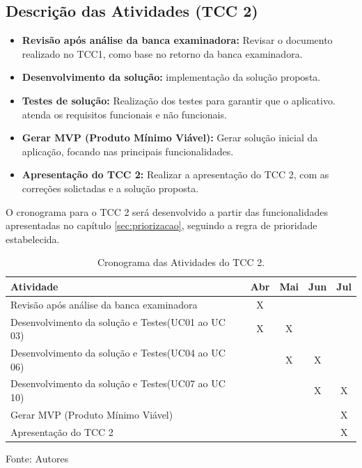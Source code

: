 \subsection{Descrição das Atividades (TCC 2)}

\begin{itemize}
    \item \textbf{Revisão após análise da banca examinadora:} Revisar o documento realizado no TCC1, como base no retorno da banca examinadora.
    \item \textbf{Desenvolvimento da solução:} implementação da solução proposta.
    \item \textbf{Testes de solução:} Realização dos testes para garantir que o aplicativo. atenda os requisitos funcionais e não funcionais.
    \item \textbf{Gerar MVP (Produto Mínimo Viável):} Gerar solução inicial da aplicação, focando nas principais funcionalidades.
    \item \textbf{Apresentação do TCC 2:} Realizar a apresentação do TCC 2, com as correções solictadas e a solução proposta.
\end{itemize}

O cronograma para o TCC 2 será desenvolvido a partir das funcionalidades apresentadas no capítulo \ref{sec:priorizacao}, seguindo a regra de prioridade estabelecida.

\begin{table}[h]
    \centering
    \caption{Cronograma das Atividades do TCC 2.}
    \label{tab:cronograma}
    \begin{adjustbox}{width=\textwidth}
        \begin{tabular}{|l|c|c|c|c|}
            \hline
            \textbf{Atividade} & \textbf{Abr} & \textbf{Mai} & \textbf{Jun} & \textbf{Jul} \\
            \hline
            Revisão após análise da banca examinadora & X &  &  & \\
            Desenvolvimento da solução e Testes(UC01 ao UC 03) & X & X &  &  \\
            Desenvolvimento da solução e Testes(UC04 ao UC 06) &  & X & X &  \\
            Desenvolvimento da solução e Testes(UC07 ao UC 10) &  &  & X & X \\
            Gerar MVP (Produto Mínimo Viável) &  &  &  & X \\
            Apresentação do TCC 2 &  &  &  & X \\
            \hline
        \end{tabular}
    \end{adjustbox}
    \vspace{5mm}
    {\footnotesize Fonte: Autores}
\end{table}

